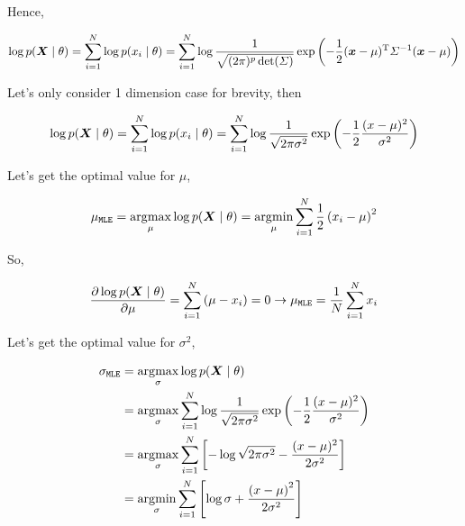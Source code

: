 Hence,

\begin{equation}
	\log p\giventhat{\vX}{\theta}  = \sum_{i=1}^{N} \log p\giventhat{x_i}{\theta} = \sum_{i=1}^{N} \log \frac{1}{\sqrt{(2\pi)^p \det(\Sigma)}} \exp\left(-\frac{1}{2} (\vx - \mu)\transp \Sigma^{-1} (\vx - \mu)\right)
\end{equation}

Let's only consider 1 dimension case for brevity, then

\begin{equation}
	\log p\giventhat{\vX}{\theta}  = \sum_{i=1}^{N} \log p\giventhat{x_i}{\theta} = \sum_{i=1}^{N} \log \frac{1}{\sqrt{2\pi \sigma^2}} \exp\left(-\frac{1}{2} \frac{(x - \mu)^2}{\sigma^2}\right)
\end{equation}

Let's get the optimal value for \(\mu\),

\begin{equation}
	\mu_{\mathtt{MLE}} = \argmax_{\mu} \log p\giventhat{\vX}{\theta} = \argmin_{\mu} \sum_{i=1}^{N} \frac{1}{2} \left(x_i - \mu\right)^2
\end{equation}

So,

\begin{equation}
	\frac{\partial \log p\giventhat{\vX}{\theta}}{\partial \mu} = \sum_{i=1}^{N} \left(\mu - x_i\right) = 0 \rightarrow \mu_{\mathtt{MLE}} = \frac{1}{N} \sum_{i=1}^{N} x_i
\end{equation}


Let's get the optimal value for \(\sigma^2\),

\begin{align*}
	\sigma_{\mathtt{MLE}} & = \argmax_{\sigma} \log p\giventhat{\vX}{\theta}                                                                                \\
	                      & =\argmax_{\sigma} \sum_{i=1}^{N} \log \frac{1}{\sqrt{2\pi \sigma^2}} \exp\left(-\frac{1}{2} \frac{(x - \mu)^2}{\sigma^2}\right) \\
	                      & = \argmax_{\sigma} \sum_{i=1}^{N} \left[ - \log\sqrt{2\pi \sigma^2} - \frac{(x - \mu)^2}{2\sigma^2} \right]                     \\
	                      & = \argmin_{\sigma} \sum_{i=1}^N \left[ \log \sigma + \frac{\left(x - \mu\right)^2}{2\sigma^2}\right]                            \\
\end{align*}

